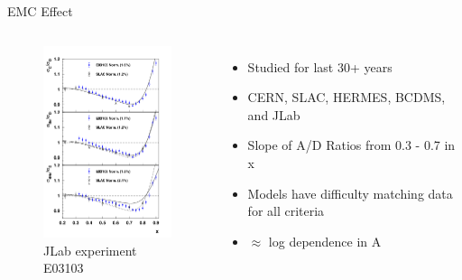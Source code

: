 \documentclass[12pt]{beamer}
\begin{document}
\begin{frame}{EMC Effect}
\begin{columns}
\vspace{-20pt}
\begin{figure}
\caption*{\label{E03103} JLab experiment E03103 \cite{E3103} }
\vspace{-20pt}
\includegraphics[width =5cm]{../images/carbon_be_he4}
\end{figure}
\hspace{10pt}
\begin{itemize}
		\item Studied for last 30+ years
		\item CERN, SLAC, HERMES, BCDMS, and JLab
		\item Slope of A/D Ratios from 0.3 - 0.7 in x
		\item Models have difficulty matching data for all criteria
		\item $\approx$ log dependence in A

\end{itemize}

\end{columns}
\end{frame}
\end{document}
